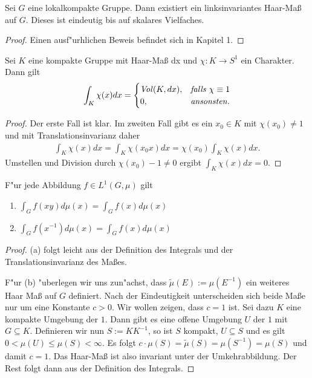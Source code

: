 	\begin{satz}\label{Satz:LCAMeasure}
		Sei $G$ eine lokalkompakte Gruppe. Dann existiert ein linksinvariantes Haar-Maß auf $G$. Dieses ist eindeutig bis auf skalares Vielfaches.
	\end{satz}
	\begin{proof}
		Einen ausf"urhlichen Beweis befindet sich in \cite{rama} Kapitel 1.
	\end{proof}
	
	\begin{lemma}\label{Lemma:trivialerCharAufKompakt}
		Sei $K$ eine kompakte Gruppe mit Haar-Maß dx und $\chi: K \to S^1$ ein Charakter. Dann gilt
		\begin{align*}
			\int_K \chi(x) dx = 
				\begin{cases}
					\text{\emph{Vol}}(K, dx),	& \text{\emph{falls} } \chi\equiv 1\\
					0,					& \text{\emph{ansonsten.}}
				\end{cases}
		\end{align*}
	\end{lemma}
	\begin{proof}
		Der erste Fall ist klar. Im zweiten Fall gibt es ein $x_0 \in K$ mit $\chi(x_0) \not=1$ und mit Translationsinvarianz daher
		\begin{align*}
			\int_K \chi(x)dx = \int_K\chi(x_0x)dx = \chi(x_0)\int_K\chi(x)dx.
		\end{align*}
		Umstellen und Division durch $\chi(x_0) - 1 \not=0$ ergibt $\int_K \chi(x)dx = 0$.
	\end{proof}
	
	\begin{lemma}F"ur jede Abbildung $f\in L^{1}(G,\mu)$ gilt
		\begin{enumerate}[label=\emph{(\alph*)}]
			\item $\int_{G} f(xy)d\mu(x) = \int_{G} f(x)d\mu(x)$
			\item $\int_{G} f(x^{-1})d\mu(x) = \int_{G} f(x)d\mu(x)$
		\end{enumerate}
	\end{lemma}
	\begin{proof}
		(a) folgt leicht aus der Definition des Integrals und der Translationsinvarianz des Maßes.
		
		F"ur (b) "uberlegen wir uns zun"achst, dass $\tilde{\mu}(E):= \mu(E^{-1})$ ein weiteres Haar Maß auf $G$ definiert. Nach der Eindeutigkeit unterscheiden sich beide Maße nur um eine Konstante $c > 0$. Wir wollen zeigen, dass $c=1$ ist.
		Sei dazu $K$ eine kompakte Umgebung der $1$. Dann gibt es eine offene Umgebung $U$ der $1$ mit $G \subseteq K$. Definieren wir nun $S := KK^{-1}$, so ist $S$ kompakt, $U \subseteq S$ und es gilt $0 < \mu(U) \leq \mu(S)<\infty$. 
		Es folgt $ c\cdot \mu(S) = \tilde{\mu}(S) = \mu(S^{-1}) =\mu(S)$ und damit $c=1$. Das Haar-Maß ist also invariant unter der Umkehrabbildung. Der Rest folgt dann aus der Definition des Integrals.
	\end{proof}
	
